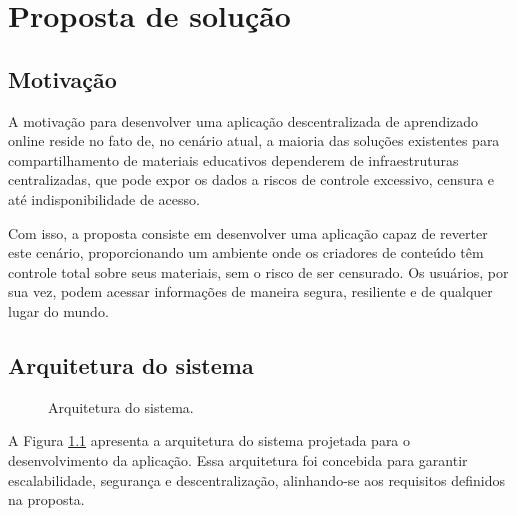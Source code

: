 \chapter[Proposta de solução]{Proposta de solução}

\section[Motivação]{Motivação}
A motivação para desenvolver uma aplicação descentralizada  de aprendizado online reside no fato de, no cenário atual, a maioria das soluções existentes para compartilhamento de materiais educativos dependerem de infraestruturas centralizadas, que pode expor os dados a riscos de controle excessivo, censura e até indisponibilidade de acesso.

Com isso, a proposta consiste em desenvolver uma aplicação capaz de reverter este cenário, proporcionando um ambiente onde os criadores de conteúdo têm controle total sobre seus materiais, sem o risco de ser censurado. Os usuários, por sua vez, podem acessar informações de maneira segura, resiliente e de qualquer lugar do mundo.

\section[Arquitetura do sistema]{Arquitetura do sistema}

\begin{figure}[h!]
    \centering
    \caption{Arquitetura do sistema.}
    \label{fig:arquitetura_sistema}
\end{figure}

A Figura \ref{fig:arquitetura_sistema} apresenta a arquitetura do sistema projetada para o desenvolvimento da aplicação. Essa arquitetura foi concebida para garantir escalabilidade, segurança e descentralização, alinhando-se aos requisitos definidos na proposta.


